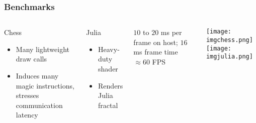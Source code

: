 \begin{frame}
\frametitle{Benchmarks}

\begin{columns}

  \begin{block}{Chess}
    \begin{itemize}
    \item Many lightweight draw calls
    \item Induces many magic instructions, stresses communication latency
    \end{itemize}
  \end{block}

  \begin{block}{Julia}
    \begin{itemize}
    \item Heavy-duty shader
    \item Renders Julia fractal
    \end{itemize}
  \end{block}

  $10$ to $20$ ms per frame on host; $16$ ms frame time $\approx60$ FPS
  

  \texttt{[image: imgchess.png]}
  \texttt{[image: imgjulia.png]}

\end{columns}
	
\end{frame}
